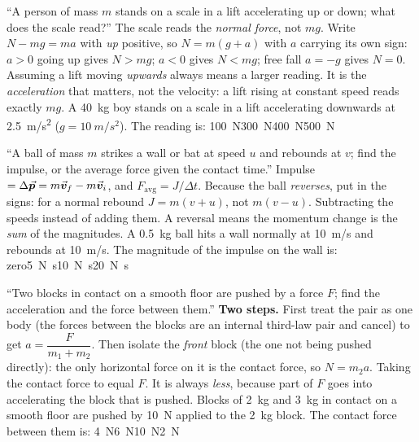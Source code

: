 {``A person of mass $m$ stands on a scale in a lift accelerating up or down; what does the scale
read?''}
{The scale reads the \emph{normal force}, not $mg$. Write $N-mg=ma$ with \emph{up} positive, so
$N=m(g+a)$ with $a$ carrying its own sign: $a>0$ going up gives $N>mg$; $a<0$ gives $N<mg$; free fall
$a=-g$ gives $N=0$.}
{Assuming a lift moving \emph{upwards} always means a larger reading. It is the \emph{acceleration}
that matters, not the velocity: a lift rising at constant speed reads exactly $mg$.}
{A \SI{40}{kg} boy stands on a scale in a lift accelerating downwards at \SI{2.5}{m/s^2}
($g=\SI{10}{m/s^2}$). The reading is:}
{\SI{100}{N}}{\SI{300}{N}}{\SI{400}{N}}{\SI{500}{N}}

{``A ball of mass $m$ strikes a wall or bat at speed $u$ and rebounds at $v$; find the impulse, or the
average force given the contact time.''}
{Impulse $=\Delta\vec{\bm{p}}=m\vec{\bm{v}}_f-m\vec{\bm{v}}_i$, and $F_{\text{avg}}=J/\Delta t$. Because the ball \emph{reverses}, put in
the signs: for a normal rebound $J=m(v+u)$, not $m(v-u)$.}
{Subtracting the speeds instead of adding them. A reversal means the momentum change is the
\emph{sum} of the magnitudes.}
{A \SI{0.5}{kg} ball hits a wall normally at \SI{10}{m/s} and rebounds at \SI{10}{m/s}. The magnitude of
the impulse on the wall is:}
{zero}{\SI{5}{N.s}}{\SI{10}{N.s}}{\SI{20}{N.s}}

{``Two blocks in contact on a smooth floor are pushed by a force $F$; find the acceleration and the
force between them.''}
{\textbf{Two steps.} First treat the pair as one body (the forces between the blocks are an internal
third-law pair and cancel) to get $a=\dfrac{F}{m_1+m_2}$. Then isolate the
\emph{front} block (the one not being pushed directly): the only horizontal force on it is the contact
force, so $N=m_2a$.}
{Taking the contact force to equal $F$. It is always \emph{less}, because part of $F$ goes into
accelerating the block that is pushed.}
{Blocks of \SI{2}{kg} and \SI{3}{kg} in contact on a smooth floor are pushed by \SI{10}{N} applied to the
\SI{2}{kg} block. The contact force between them is:}
{\SI{4}{N}}{\SI{6}{N}}{\SI{10}{N}}{\SI{2}{N}}

